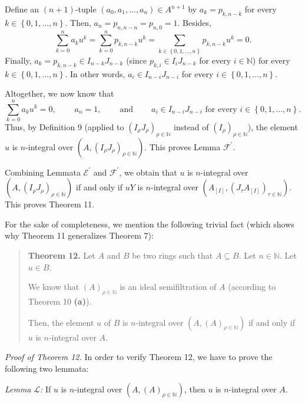\documentclass[12pt,final,notitlepage,onecolumn]{article}%
\begin{document}
Define an $\left(  n+1\right)  $-tuple $\left(  a_{0},a_{1},...,a_{n}\right)
\in A^{n+1}$ by $a_{k}=p_{k,n-k}$ for every $k\in\left\{  0,1,...,n\right\}
.$ Then, $a_{n}=p_{n,n-n}=p_{n,0}=1$. Besides,%
\[
\sum\limits_{k=0}^{n}a_{k}u^{k}=\sum\limits_{k=0}^{n}p_{k,n-k}u^{k}%
=\sum\limits_{k\in\left\{  0,1,...,n\right\}  }p_{k,n-k}u^{k}=0.
\]
Finally, $a_{k}=p_{k,n-k}\in I_{n-k}J_{n-k}$ (since $p_{k,i}\in I_{i}J_{n-k}$
for every $i\in\mathbb{N}$) for every $k\in\left\{  0,1,...,n\right\}  $. In
other words, $a_{i}\in I_{n-i}J_{n-i}$ for every $i\in\left\{
0,1,...,n\right\}  $.

Altogether, we now know that%
\[
\sum\limits_{k=0}^{n}a_{k}u^{k}=0,\ \ \ \ \ \ \ \ \ \ a_{n}%
=1,\ \ \ \ \ \ \ \ \ \ \text{and}\ \ \ \ \ \ \ \ \ \ a_{i}\in I_{n-i}%
J_{n-i}\text{ for every }i\in\left\{  0,1,...,n\right\}  .
\]
Thus, by Definition 9 (applied to $\left(  I_{\rho}J_{\rho}\right)  _{\rho
\in\mathbb{N}}$ instead of $\left(  I_{\rho}\right)  _{\rho\in\mathbb{N}}$),
the element $u$ is $n$-integral over $\left(  A,\left(  I_{\rho}J_{\rho
}\right)  _{\rho\in\mathbb{N}}\right)  $. This proves Lemma $\mathcal{F}%
^{\prime}$.

Combining Lemmata $\mathcal{E}^{\prime}$ and $\mathcal{F}^{\prime}$, we obtain
that $u$ is $n$-integral over $\left(  A,\left(  I_{\rho}J_{\rho}\right)
_{\rho\in\mathbb{N}}\right)  $ if and only if $uY$ is $n$-integral over
$\left(  A_{\left[  I\right]  },\left(  J_{\tau}A_{\left[  I\right]  }\right)
_{\tau\in\mathbb{N}}\right)  $. This proves Theorem 11.

For the sake of completeness, we mention the following trivial fact (which
shows why Theorem 11 generalizes Theorem 7):

\begin{quote}
\textbf{Theorem 12.} Let $A$ and $B$ be two rings such that $A\subseteq B$.
Let $n\in\mathbb{N}$. Let $u\in B$.

We know that $\left(  A\right)  _{\rho\in\mathbb{N}}$ is an ideal
semifiltration of $A$ (according to Theorem 10 \textbf{(a)}).

Then, the element $u$ of $B$ is $n$-integral over $\left(  A,\left(  A\right)
_{\rho\in\mathbb{N}}\right)  $ if and only if $u$ is $n$-integral over $A$.
\end{quote}

\textit{Proof of Theorem 12.} In order to verify Theorem 12, we have to prove
the following two lemmata:

\textit{Lemma }$\mathcal{L}$\textit{:} If $u$ is $n$-integral over $\left(
A,\left(  A\right)  _{\rho\in\mathbb{N}}\right)  $, then $u$ is $n$-integral
over $A$.
\end{document}
